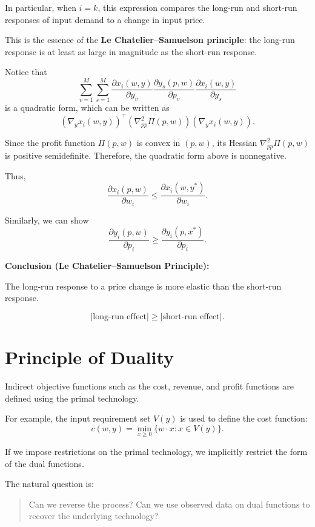 In particular, when $i=k$, this expression compares the long-run and short-run
responses of input demand to a change in input price.

This is the essence of the \textbf{Le Chatelier--Samuelson principle}:
the long-run response is at least as large in magnitude as the short-run response.



Notice that
\[
\sum_{v=1}^M \sum_{s=1}^M
\frac{\partial x_i(w,y)}{\partial y_v}
\frac{\partial y_s(p,w)}{\partial p_v}
\frac{\partial x_i(w,y)}{\partial y_s}
\]
is a quadratic form, which can be written as
\[
\left( \nabla_y x_i(w,y) \right)^\top
\left( \nabla^2_{pp} \Pi(p,w) \right)
\left( \nabla_y x_i(w,y) \right).
\]

Since the profit function $\Pi(p,w)$ is convex in $(p,w)$,
its Hessian $\nabla^2_{pp}\Pi(p,w)$ is positive semidefinite.
Therefore, the quadratic form above is nonnegative.

\medskip

Thus,
\[
\frac{\partial x_i(p,w)}{\partial w_i}
\le
\frac{\partial x_i(w,y^*)}{\partial w_i}.
\]

Similarly, we can show
\[
\frac{\partial y_i(p,w)}{\partial p_i}
\ge
\frac{\partial y_i(p,x^*)}{\partial p_i}.
\]

\medskip

\textbf{Conclusion (Le Chatelier--Samuelson Principle):}

The long-run response to a price change is more elastic than the short-run response.

\[
|\text{long-run effect}| \ge |\text{short-run effect}|.
\]

\section{Principle of Duality}

Indirect objective functions such as the cost, revenue, and profit functions
are defined using the primal technology.

For example, the input requirement set $V(y)$ is used to define the cost function:
\[
c(w,y)=\min_{x \ge 0} \{ w \cdot x : x \in V(y) \}.
\]

\medskip

If we impose restrictions on the primal technology, we implicitly restrict
the form of the dual functions.

\medskip

The natural question is:

\begin{quote}
Can we reverse the process?  
Can we use observed data on dual functions to recover the underlying technology?
\end{quote}

